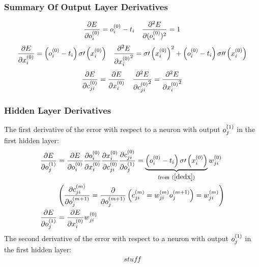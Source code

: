\subsubsection{Summary Of Output Layer Derivatives}
\begin{align}
&\pdv{E}{o_{i}^{(0)}} = o_{i}^{(0)} - t_{i} 
&
\pdv[2]{E}{(o_{i}^{(0)})} = 1
\end{align}
\begin{align}
&\pdv{E}{x_{i}^{(0)}} = \left(o_{i}^{(0)} - t_{i}\right)\sigma\prime\left(x_{i}^{(0)}\right)
& 
\pdv[2]{E}{{x_{i}^{(0)}}} = \sigma\prime\left(x_{i}^{(0)}\right)^2 + \left(o_{i}^{(0)} - t_{i}\right)\sigma\prime\prime\left(x_{i}^{(0)}\right)
\end{align}
\begin{align}
&\pdv{E}{{c_{ji}^{(0)}}} = \pdv{E}{{x_{i}^{(0)}}}
&
\pdv[2]{E}{{c_{ji}^{(0)}}} = \pdv[2]{E}{{x_{i}^{(0)}}}
\end{align}
\subsubsection{Hidden Layer Derivatives}
The first derivative of the error with respect to a neuron with output $o_{j}^{(1)}$ in the first hidden layer:
\begin{align}
\pdv{E}{o_{j}^{(1)}} &= 
\pdv{E}{o_{i}^{(0)}}
\pdv{o_{i}^{(0)}}{x_{i}^{(0)}}
\pdv{x_{i}^{(0)}}{c_{ji}^{(0)}}
\pdv{c_{ji}^{(0)}}{o_{j}^{(1)}}
= 
\underbrace{\left(o_{i}^{(0)} - t_{i}\right)\sigma\prime\left(x_{i}^{(0)}\right)}
_{\text{from} \ (\ref{dedx})}
w_{ji}^{(0)}
\\
&\left(\pdv{{c_{ji}^{(m)}}}{{o_{j}^{(m+1)}}} = \pdv{}{{o_{j}^{(m+1)}}}\left(c_{ji}^{(m)} = w_{ji}^{(m)}o_{j}^{(m+1)}\right) = w_{ji}^{(m)}\right)\label{dcdo}
\\
\pdv{E}{o_{j}^{(1)}} &= \pdv{E}{x_{i}^{(0)}}w_{ji}^{(0)}
\end{align}
The second derivative of the error with respect to a neuron with output $o_{j}^{(1)}$ in the first hidden layer:
\begin{align}
stuff
\end{align}
%
